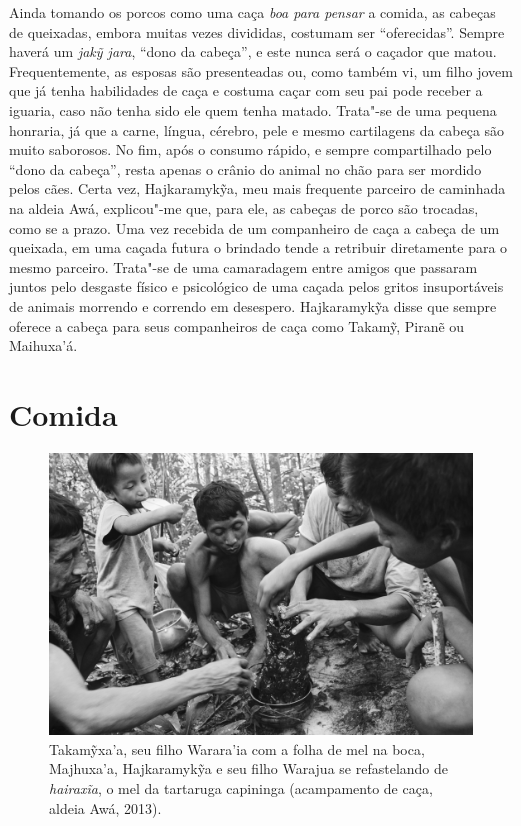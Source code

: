Ainda tomando os porcos como uma caça \emph{boa para pensar} a comida,
as cabeças de queixadas, embora muitas vezes divididas, costumam ser
``oferecidas''. Sempre haverá um \emph{jakỹ jara}, ``dono da cabeça'', e
este nunca será o caçador que matou. Frequentemente, as esposas são
presenteadas ou, como também vi, um filho jovem que já tenha habilidades
de caça e costuma caçar com seu pai pode receber a iguaria, caso não
tenha sido ele quem tenha matado. Trata"-se de uma pequena honraria, já
que a carne, língua, cérebro, pele e mesmo cartilagens da cabeça são
muito saborosos. No fim, após o consumo rápido, e sempre compartilhado
pelo ``dono da cabeça'', resta apenas o crânio do animal no chão para
ser mordido pelos cães. Certa vez, Hajkaramykỹa, meu mais frequente
parceiro de caminhada na aldeia Awá, explicou"-me que, para ele,
as cabeças de porco são trocadas, como se a prazo. Uma vez recebida de
um companheiro de caça a cabeça de um queixada, em uma caçada futura o
brindado tende a retribuir diretamente para o mesmo parceiro. Trata"-se
de uma camaradagem entre amigos que passaram juntos pelo desgaste físico
e psicológico de uma caçada pelos gritos insuportáveis de animais
morrendo e correndo em desespero. Hajkaramykỹa disse que sempre oferece
a cabeça para seus companheiros de caça como Takamỹ, Piranẽ ou
Maihuxa'á.

\section{Comida}

\begin{figure}[!hb]
\centering
  \includegraphics[width=\textwidth]{./imgs/IMG_1672}
\caption{Takamỹxa'a, seu filho Warara’ia com a folha de mel na boca, Majhuxa’a,
Hajkaramykỹa e seu filho Warajua se refastelando de \emph{hairaxĩa}, o mel da tartaruga
capininga (acampamento de caça, aldeia Awá, 2013).}
\end{figure}

